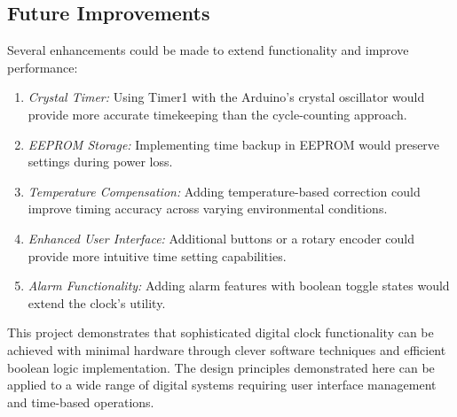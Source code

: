 \documentclass{article}
\begin{document}
\subsection{Future Improvements}
Several enhancements could be made to extend functionality and improve performance:

\begin{enumerate}
\item \textit{Crystal Timer:} Using Timer1 with the Arduino's crystal oscillator would provide more accurate timekeeping than the cycle-counting approach.
\item \textit{EEPROM Storage:} Implementing time backup in EEPROM would preserve settings during power loss.
\item \textit{Temperature Compensation:} Adding temperature-based correction could improve timing accuracy across varying environmental conditions.
\item \textit{Enhanced User Interface:} Additional buttons or a rotary encoder could provide more intuitive time setting capabilities.
\item \textit{Alarm Functionality:} Adding alarm features with boolean toggle states would extend the clock's utility.
\end{enumerate}

This project demonstrates that sophisticated digital clock functionality can be achieved with minimal hardware through clever software techniques and efficient boolean logic implementation. The design principles demonstrated here can be applied to a wide range of digital systems requiring user interface management and time-based operations.
\end{document}
